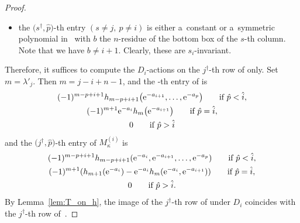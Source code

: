 \documentclass[pdftex]{sigma}
\numberwithin{equation}{section}
\theoremstyle{definition}
\begin{document}
\begin{proof}
\begin{itemize}
\item the $\bigl(s^\dagger,\hat{p}\bigr)$-th entry $(s\neq j,\ p\neq i)$ is either a~constant or a~symmetric polynomial in~ with $b$ the $n$-residue of the bottom box of
the $s$-th column. Note that we have $b\ne i+1$.
Clearly, these are $s_i$-invariant.
\end{itemize}
Therefore, it suffices to compute the $D_i$-actions on the $j^\dagger$-th row of  only.
Set
$m=\lambda'_j$.
Then
$m=j-i+n-1$,
and the -th entry of  is
\begin{gather*}
(-1)^{m-p+i+1}h_{m-p+i+1}\bigl({\rm e}^{-a_{i+1}},\dots,{\rm e}^{-a_p}\bigr) \qquad \text{if} \ \hat{p}<\hat{i},\\
(-1)^{m+1}{\rm e}^{-a_i}h_{m}\bigl({\rm e}^{-a_{i+1}}\bigr) \qquad \text{if} \ \hat{p}=\hat{i},\\
0 \qquad \text{if} \ \hat{p}>\hat{i}
\end{gather*}
and the $\bigl(j^\dagger,\hat{p}\bigr)$-th entry of $M^{(i)}_\kappa$ is
\begin{gather*}
(-1)^{m-p+i+1}h_{m-p+i+1}({\rm e}^{-a_i},{\rm e}^{-a_{i+1}},\dots,{\rm e}^{-a_p}) \qquad \text{if} \
\hat{p}<\hat{i},\\
(-1)^{m+1}
(
h_{m+1}({\rm e}^{-a_i})
-{\rm e}^{-a_i}h_{m}({\rm e}^{-a_i},{\rm e}^{-a_{i+1}})
) \qquad \text{if} \  \hat{p}=\hat{i},\\
0   \qquad \text{if} \ \hat{p}>\hat{i}.
\end{gather*}
By Lemma~\ref{lem:T_on_h}, the image of the $j^\dagger$-th row of  under $D_i$ coincides with the $j^\dagger$-th row of~.
\end{proof}
\end{document}
